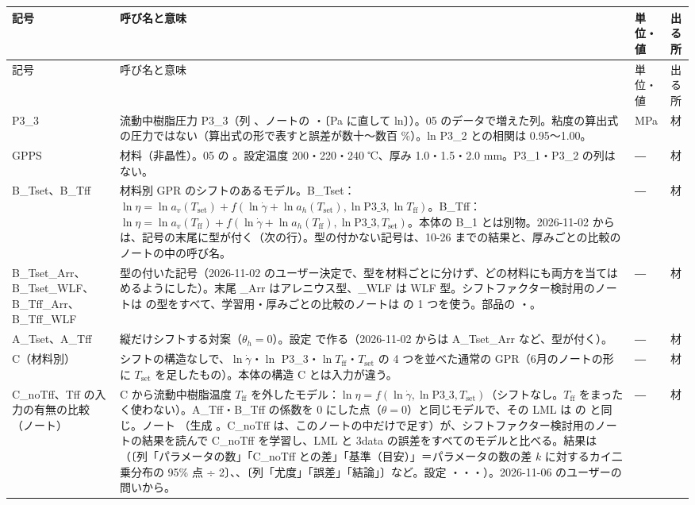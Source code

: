 \documentclass[paper=a4paper,fontsize=10.5pt,line_length=44zw,number_of_lines=38]{jlreq}
\makeatletter
\newcommand{\file}[1]{\texttt{\detokenize{#1}}}
\newcommand{\gd}{\dot{\gamma}}
\newcommand{\Tff}{T_{\mathrm{ff}}}
\newcommand{\Tset}{T_{\mathrm{set}}}
\newenvironment{symtab}{%
  \begin{longtable}{@{}>{\raggedright\arraybackslash}p{6.5\zw}>{\raggedright\arraybackslash}p{22\zw}>{\raggedright\arraybackslash}p{6\zw}>{\raggedright\arraybackslash}p{4.5\zw}@{}}
  \toprule 記号 & 呼び名と意味 & 単位・値 & 出る所 \\ \midrule \endfirsthead
  \toprule 記号 & 呼び名と意味 & 単位・値 & 出る所 \\ \midrule \endhead
  \bottomrule \endlastfoot}{\end{longtable}}
\makeatother
\begin{document}
\begin{symtab}
P3\_3 & 流動中樹脂圧力 P3\_3（列 \file{流動中樹脂圧力P3_3(MPa)}、ノートの \file{P33}・\file{ln_P33}〔Pa に直して ln〕）。05 のデータで増えた列。粘度の算出式の圧力ではない（算出式の形で表すと誤差が数十〜数百 \%）。ln P3\_2 との相関は 0.95〜1.00。 & MPa & 材 \\
GPPS & 材料（非晶性）。05 の \file{03_GPPS実験(データと結果)}。設定温度 200・220・240 ℃、厚み 1.0・1.5・2.0 mm。P3\_1・P3\_2 の列はない。 & ― & 材 \\
B\_Tset、B\_Tff & 材料別 GPR のシフトのあるモデル。B\_Tset：$\ln\eta=\ln a_v(\Tset)+f(\ln\gd+\ln a_h(\Tset),\ln\mathrm{P3\_3},\ln\Tff)$。B\_Tff：$\ln\eta=\ln a_v(\Tff)+f(\ln\gd+\ln a_h(\Tff),\ln\mathrm{P3\_3},\Tset)$。本体の B\_1 とは別物。2026-11-02 からは、記号の末尾に型が付く（次の行）。型の付かない記号は、10-26 までの結果と、厚みごとの比較のノートの中の呼び名。 & ― & 材 \\
B\_Tset\_Arr、B\_Tset\_WLF、B\_Tff\_Arr、B\_Tff\_WLF & 型の付いた記号（2026-11-02 のユーザー決定で、型を材料ごとに分けず、どの材料にも両方を当てはめるようにした）。末尾 \_Arr はアレニウス型、\_WLF は WLF 型。シフトファクター検討用のノートは \file{SHIFT_FORMS} の型をすべて、学習用・厚みごとの比較のノートは \file{SHIFT_FORM} の 1 つを使う。部品の \file{shift_key(col, struct, form)}・\file{key_form}。 & ― & 材 \\
A\_Tset、A\_Tff & 縦だけシフトする対案（$\theta_h=0$）。設定 \file{STRUCTS = ["B", "A"]} で作る（2026-11-02 からは A\_Tset\_Arr など、型が付く）。 & ― & 材 \\
C（材料別） & シフトの構造なしで、$\ln\gd$・$\ln$ P3\_3・$\ln\Tff$・$\Tset$ の 4 つを並べた通常の GPR（6月のノートの形に $\Tset$ を足したもの）。本体の構造 C とは入力が違う。 & ― & 材 \\
C\_noTff、Tff の入力の有無の比較（ノート） & C から流動中樹脂温度 $\Tff$ を外したモデル：$\ln\eta=f(\ln\gd,\ln\mathrm{P3\_3},\Tset)$（シフトなし。$\Tff$ をまったく使わない）。A\_Tff・B\_Tff の係数を 0 にした点（$\theta=0$）と同じモデルで、その LML は \file{シフトファクターの推定.csv} の \file{LML_at_0} と同じ。ノート \file{材料別_Tffの入力の有無の比較_ARD対応Matern52＋線形＋ホワイトノイズ.ipynb}（生成 \file{build_mat_tff_input_nb.py}。C\_noTff は、このノートの中だけで足す）が、シフトファクター検討用のノートの結果を読んで C\_noTff を学習し、LML と 3data の誤差をすべてのモデルと比べる。結果は \file{<版>/全厚み総合/Tffの入力の有無の比較/}（\file{対数周辺尤度の比較.csv}〔列「パラメータの数」「C\_noTff との差」「基準（目安）」＝パラメータの数の差 $k$ に対するカイ二乗分布の 95\% 点 ÷ 2〕、\file{予測検証_3data_指標_全モデル.csv}、\file{Tffの入力の有無_まとめ.csv}〔列「尤度」「誤差」「結論」〕など。設定 \file{LML_CLEAR}・\file{RMSE_RATIO}・\file{LML_CHECK}・\file{SAVE_ROOT}）。2026-11-06 のユーザーの問いから。 & ― & 材 \\

\end{symtab}
\end{document}
